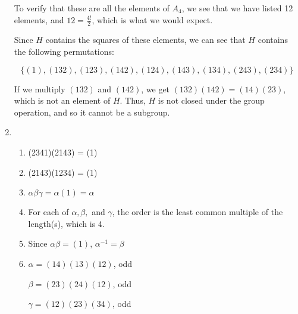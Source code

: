 \documentclass{article}
\begin{document}
\begin{enumerate}
    

    To verify that these are all the elements of $A_4$, we see that we have listed 12 elements, and $12 = \frac{4!}{2}$, which is what we would expect.

    Since $H$ contains the squares of these elements, we can see that $H$ contains the following permutations:

    $$\{(1), (132), (123), (142), (124), (143), (134), (243), (234)\}$$

    If we multiply $(132)$ and $(142)$, we get $(132)(142) = (14)(23)$, which is not an element of $H$. Thus, $H$ is not closed under the group operation, and so it cannot be a subgroup. 

    \item 
    \begin{enumerate}
        \item (2341)(2143) = (1)
        \item (2143)(1234) = (1)
        \item $\alpha\beta\gamma = \alpha(1) = \alpha$
        \item For each of $\alpha, \beta, $ and $\gamma$, the order is the least common multiple of the length(s), which is 4.
        \item Since $\alpha\beta = (1)$, $\alpha^{-1} = \beta$
        \item $\alpha = (14)(13)(12)$, odd
        
        $\beta = (23)(24)(12)$, odd
        
        $\gamma = (12)(23)(34)$, odd
    \end{enumerate}
    
\end{enumerate}
\end{document}
